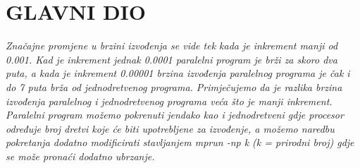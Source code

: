 \documentclass[conference]{IEEEtran}
\begin{document}
\section{GLAVNI DIO}

\textit{
Značajne promjene u brzini izvođenja se vide tek kada je inkrement manji od 0.001. Kad je inkrement jednak 0.0001 paralelni program je brži za skoro dva puta, a kada je inkrement 0.00001 brzina izvođenja paralelnog programa je čak i do 7 puta brža od jednodretvenog programa. Primječujemo da je razlika brzina izvođenja paralelnog i jednodretvenog programa veća što je manji inkrement. Paralelni program možemo pokrenuti jendako kao i jednodretveni gdje procesor određuje broj dretvi koje će biti upotrebljene za izvođenje, a možemo naredbu pokretanja dodatno modificirati stavljanjem mprun -np k (k = prirodni broj) gdje se može pronaći dodatno ubrzanje.}
\end{document}
